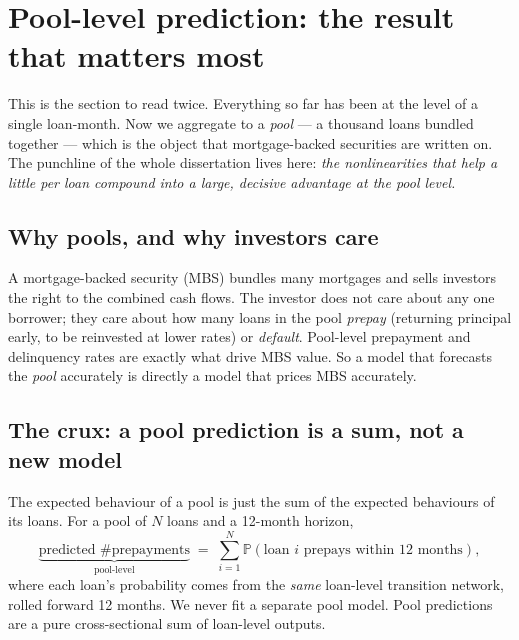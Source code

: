 \documentclass[11pt]{article}
\newcommand{\Prob}{\mathbb{P}}
\begin{document}
\section{Pool-level prediction: the result that matters most}
\label{sec:pool}

This is the section to read twice. Everything so far has been at the level of a single
loan-month. Now we aggregate to a \emph{pool} --- a thousand loans bundled together --- which
is the object that mortgage-backed securities are written on. The punchline of the whole
dissertation lives here: \emph{the nonlinearities that help a little per loan compound into a
large, decisive advantage at the pool level.}

\subsection{Why pools, and why investors care}

\begin{jargon}
A mortgage-backed security (MBS) bundles many mortgages and sells investors the right to the
combined cash flows. The investor does not care about any one borrower; they care about how
many loans in the pool \emph{prepay} (returning principal early, to be reinvested at lower
rates) or \emph{default}. Pool-level prepayment and delinquency rates are exactly what drive
MBS value. So a model that forecasts the \emph{pool} accurately is directly a model that
prices MBS accurately.
\end{jargon}

\subsection{The crux: a pool prediction is a sum, not a new model}

\begin{keyidea}
The expected behaviour of a pool is just the sum of the expected behaviours of its loans.
For a pool of $N$ loans and a 12-month horizon,
\begin{equation}
  \underbrace{\text{predicted \# prepayments}}_{\text{pool-level}}
  \;=\; \sum_{i=1}^{N} \Prob\!\left(\text{loan } i \text{ prepays within 12 months}\right),
  \label{eq:poolsum}
\end{equation}
where each loan's probability comes from the \emph{same} loan-level transition network, rolled
forward 12 months. We never fit a separate pool model. Pool predictions are a pure
cross-sectional sum of loan-level outputs.
\end{keyidea}
\end{document}
